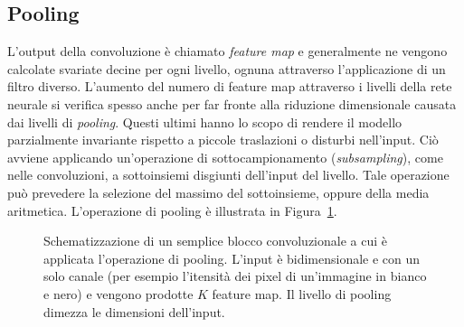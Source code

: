 \subsection{Pooling}
L'output della convoluzione è chiamato \emph{feature map} e generalmente ne
vengono calcolate svariate decine per ogni livello, ognuna attraverso
l'applicazione di un filtro diverso. L'aumento del numero di feature map
attraverso i livelli della rete neurale si verifica spesso anche per far fronte
alla riduzione dimensionale causata dai livelli di \emph{pooling}. Questi
ultimi hanno lo scopo di rendere il modello parzialmente invariante rispetto a
piccole traslazioni o disturbi nell'input.  Ciò avviene applicando
un'operazione di sottocampionamento (\emph{subsampling}), come nelle
convoluzioni, a sottoinsiemi disgiunti dell'input del livello. Tale operazione
può prevedere la selezione del massimo del sottoinsieme, oppure della media
aritmetica. L'operazione di pooling è illustrata in Figura~\ref{fig:pooling}.
\begin{figure}[!htp]
  \caption{%
    Schematizzazione di un semplice blocco convoluzionale a cui è applicata
    l'operazione di pooling. L'input è bidimensionale e con un solo canale (per
    esempio l'itensità dei pixel di un'immagine in bianco e nero) e vengono
    prodotte \(K\) feature map. Il livello di pooling dimezza le dimensioni
    dell'input.
  }%
  \label{fig:pooling}
\end{figure}



